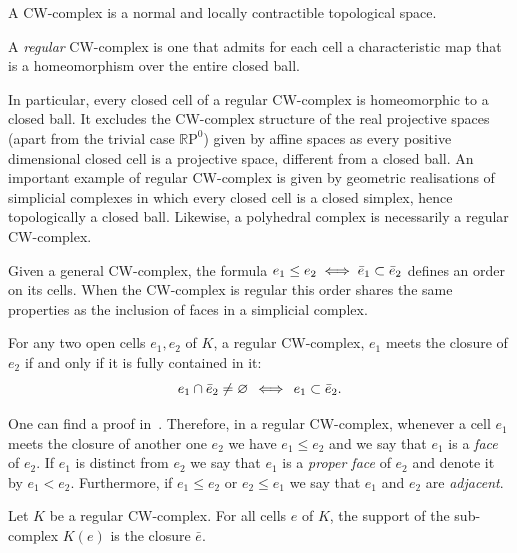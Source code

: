 \documentclass[AHL,Unicode,longabstracts,published]{cedram}
\newcommand{\R}{\mathbb{R}}
\renewcommand{\P}{\mathrm{P}}
\begin{document}
\begin{prop}
A CW-complex is a normal and locally contractible topological space.
\end{prop}

\begin{defi}
A \emph{regular} CW-complex is one that admits for each cell a characteristic map that is a homeomorphism over the entire closed ball.
\end{defi}

In particular, every closed cell of a regular CW-complex is homeomorphic to a closed ball. It excludes the CW-complex structure of the real projective spaces (apart from the trivial case $\R \P^0$) given by affine spaces as every positive dimensional closed cell is a projective space, different from a closed ball. An important example of regular CW-complex is given by geometric realisations of simplicial complexes in which every closed cell is a closed simplex, hence topologically a closed ball. Likewise, a polyhedral complex is necessarily a regular CW-complex.


Given a general CW-complex, the formula $e_1\leq e_2\iff \Bar{e}_1\subset\Bar{e}_2$ defines an order on its cells. When the CW-complex is regular this order shares the same properties as the inclusion of faces in a simplicial complex.

\begin{lemm}
For any two open cells $e_1,e_2$ of $K$, a regular CW-complex, $e_1$ meets the closure of $e_2$ if and only if it is fully contained in it:
\begin{equation*}
e_1\cap\Bar{e}_2\neq \varnothing \, \iff\, e_1\subset \Bar{e}_2.
\end{equation*}
\end{lemm}

One can find a proof in~\cite[pp.~229-230, R.R.1]{Coo-Fin_hom_cel}.
Therefore, in a regular CW-complex, whenever a cell $e_1$ meets the closure of another one $e_2$ we have $e_1\leq e_2$ and we say that $e_1$ is a \emph{face} of $e_2$. If $e_1$ is distinct from $e_2$ we say that $e_1$ is a \emph{proper face} of $e_2$ and denote it by $e_1<e_2$. Furthermore, if $e_1\leq e_2$ or $e_2\leq e_1$ we say that $e_1$ and $e_2$ are \emph{adjacent}.

\begin{lemm}
Let $K$ be a regular CW-complex. For all cells $e$ of $K$, the support of the sub-complex $K(e)$ is the closure $\bar{e}$.
\end{lemm}
\end{document}
